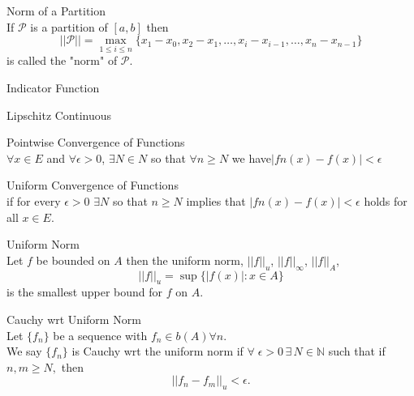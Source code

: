 \documentclass{article}
\newcommand{\natnums}{{\mathbb N}}
\newcommand{\norm}[1]{\left|\left|#1\right|\right|}
\begin{document}
\begin{description}
\item Norm of a Partition \label{partitionnorm}\hfill \\
If \(\mathcal{P}\) is a partition of \([a,b]\) then 
\[||\mathcal{P}|| = \max_{1\leq i\leq n}\{x_1-x_0, x_2-x_1, \dots, x_i- x_{i-1},\dots, x_n-x_{n-1}\}\]
 is called the "norm" of \(\mathcal{P}.\)

\item Indicator Function\label{indicator}\hfill \\


\item Lipschitz Continuous\label{Lipschitz}\hfill \\

\item Pointwise Convergence of Functions\label{pointwiseConv}\hfill \\
$\forall x \in E$ and $\forall \epsilon > 0$, $\exists N \in N$ so that $\forall n\geq N$ we
have$ |fn(x)- f(x)| < \epsilon$

\item Uniform Convergence of Functions\label{uniformConv}\hfill \\
if for every $\epsilon > 0$ $\exists N$ so that $n \geq N$
implies that $|fn(x) -f(x)| < \epsilon$ holds for all $x\in E$.
    
\item Uniform Norm\label{unorm}\hfill \\
Let $f$ be bounded on $A$ then the uniform norm, $||f||_u$, $||f||_\infty$, $||f||_A$, $$||f||_u=\sup\{|f(x)|:x\in A\}$$ is the smallest upper bound for $f$ on $A$. 

\item Cauchy wrt Uniform Norm\hfill \\
    Let \(\{f_n\}\) be a sequence with \(f_n\in b(A) \forall n\).  \\
    We say \(\{f_n\}\) is Cauchy wrt the uniform norm if \(\forall\;\epsilon >0 \,\exists\,N\in\natnums\) such that 
    if \(n,m\geq N,\) then
    \[\norm{f_n-f_m}_u < \epsilon.\]
    
\end{description}
\end{document}
